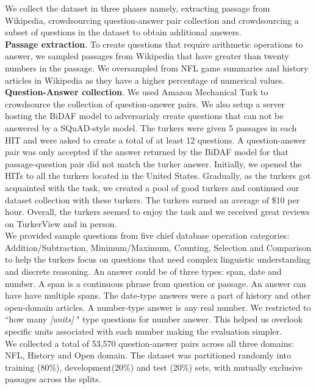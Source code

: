 
We collect the dataset in three phases namely, extracting passage from Wikipedia, crowdsourcing question-answer pair collection and crowdsourcing a subset of questions in the dataset to obtain additional answers. 
\\
\textbf{Passage extraction}. To create questions that require arithmetic operations to answer, we sampled passages from Wikipedia  that have greater than twenty numbers in the passage. We oversampled from NFL game summaries and history articles in Wikipedia as they have a higher percentage of numerical values. 
\\
\textbf{Question-Answer collection}. We used Amazon Mechanical Turk to crowdsource the collection of question-answer pairs. We also setup a server hosting the BiDAF model to adversarialy create questions that can not be answered by a SQuAD-style model. The turkers were given 5 passages in each HIT and were asked to create a total of at least 12 questions. A question-answer pair was only accepted if the answer returned by the BiDAF model for that passage-question pair did not match the turker answer. Initially, we opened the HITs to all the turkers located in the United States. Gradually, as the turkers got acquainted with the task, we created a pool of good turkers and continued our dataset collection with these turkers. The turkers earned an average of \$10 per hour. Overall, the turkers seemed to enjoy the task and we received great reviews on TurkerView and in person.
\\
We provided sample questions from five chief database operation categories: Addition/Subtraction, Minimum/Maximum, Counting, Selection and Comparison to help the turkers focus on questions that need complex linguistic understanding and discrete reasoning. An answer could be of three types: span, date and number. A span is a continuous phrase from question or passage. An answer can have have multiple spans. The date-type answers were a part of history and other open-domain articles. A number-type answer is any real number. We restricted to ``how many \textit{[units]} " type questions for number answer. This helped us overlook specific units associated with each number making the evaluation simpler.
\\
We collected a total of 53,570  question-answer pairs across all three domains: NFL, History and Open domain. The dataset was partitioned randomly into training (80\%), development(20\%) and test (20\%) sets, with mutually exclusive passages across the splits.


